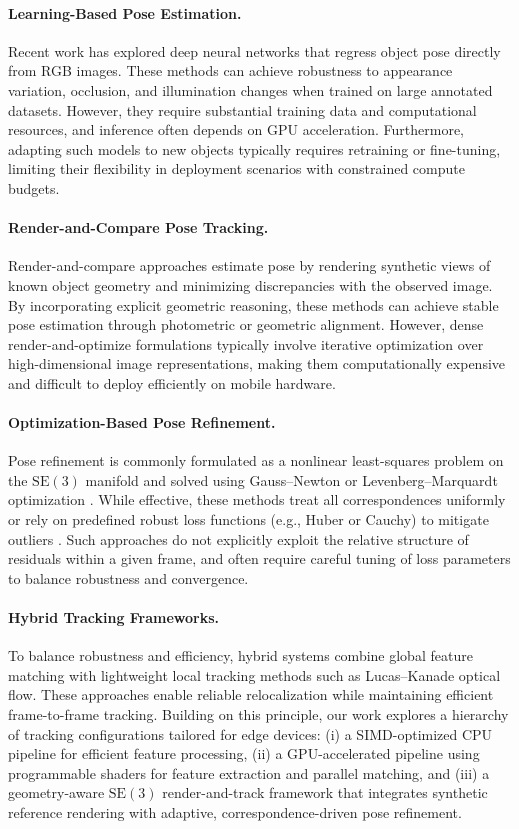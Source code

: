 \paragraph{Learning-Based Pose Estimation.}
Recent work has explored deep neural networks that regress object pose directly from RGB images. These methods can achieve robustness to appearance variation, occlusion, and illumination changes when trained on large annotated datasets. However, they require substantial training data and computational resources, and inference often depends on GPU acceleration. Furthermore, adapting such models to new objects typically requires retraining or fine-tuning, limiting their flexibility in deployment scenarios with constrained compute budgets.

\paragraph{Render-and-Compare Pose Tracking.}
Render-and-compare approaches estimate pose by rendering synthetic views of known object geometry and minimizing discrepancies with the observed image. By incorporating explicit geometric reasoning, these methods can achieve stable pose estimation through photometric or geometric alignment. However, dense render-and-optimize formulations typically involve iterative optimization over high-dimensional image representations, making them computationally expensive and difficult to deploy efficiently on mobile hardware.

\paragraph{Optimization-Based Pose Refinement.}
Pose refinement is commonly formulated as a nonlinear least-squares problem on the $\mathrm{SE}(3)$ manifold and solved using Gauss--Newton or Levenberg--Marquardt optimization \cite{triggs1999bundle, nocedal2006}. While effective, these methods treat all correspondences uniformly or rely on predefined robust loss functions (e.g., Huber or Cauchy) to mitigate outliers \cite{huber1964, black1996}. Such approaches do not explicitly exploit the relative structure of residuals within a given frame, and often require careful tuning of loss parameters to balance robustness and convergence.

\paragraph{Hybrid Tracking Frameworks.}
To balance robustness and efficiency, hybrid systems combine global feature matching with lightweight local tracking methods such as Lucas--Kanade optical flow. These approaches enable reliable relocalization while maintaining efficient frame-to-frame tracking. Building on this principle, our work explores a hierarchy of tracking configurations tailored for edge devices: (i) a SIMD-optimized CPU pipeline for efficient feature processing, (ii) a GPU-accelerated pipeline using programmable shaders for feature extraction and parallel matching, and (iii) a geometry-aware $\mathrm{SE}(3)$ render-and-track framework that integrates synthetic reference rendering with adaptive, correspondence-driven pose refinement.